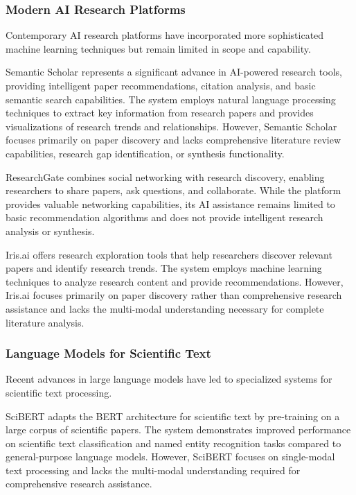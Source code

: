 \documentclass[10pt,twocolumn]{article}
\begin{document}
\subsubsection{Modern AI Research Platforms}

Contemporary AI research platforms have incorporated more sophisticated machine learning techniques but remain limited in scope and capability.

Semantic Scholar \cite{ammar2018construction} represents a significant advance in AI-powered research tools, providing intelligent paper recommendations, citation analysis, and basic semantic search capabilities. The system employs natural language processing techniques to extract key information from research papers and provides visualizations of research trends and relationships. However, Semantic Scholar focuses primarily on paper discovery and lacks comprehensive literature review capabilities, research gap identification, or synthesis functionality.

ResearchGate \cite{thelwall2014researchgate} combines social networking with research discovery, enabling researchers to share papers, ask questions, and collaborate. While the platform provides valuable networking capabilities, its AI assistance remains limited to basic recommendation algorithms and does not provide intelligent research analysis or synthesis.

Iris.ai \cite{iris2019} offers research exploration tools that help researchers discover relevant papers and identify research trends. The system employs machine learning techniques to analyze research content and provide recommendations. However, Iris.ai focuses primarily on paper discovery rather than comprehensive research assistance and lacks the multi-modal understanding necessary for complete literature analysis.

\subsubsection{Language Models for Scientific Text}

Recent advances in large language models have led to specialized systems for scientific text processing.

SciBERT \cite{beltagy2019scibert} adapts the BERT architecture for scientific text by pre-training on a large corpus of scientific papers. The system demonstrates improved performance on scientific text classification and named entity recognition tasks compared to general-purpose language models. However, SciBERT focuses on single-modal text processing and lacks the multi-modal understanding required for comprehensive research assistance.
\end{document}

